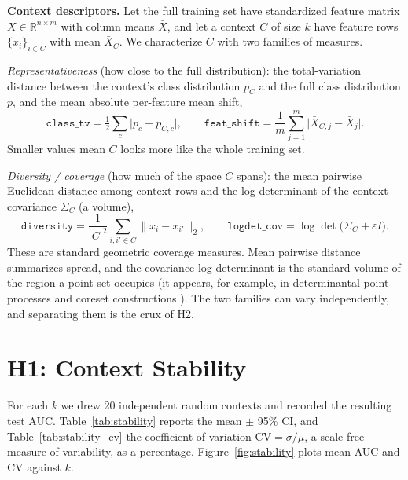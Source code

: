 \documentclass[11pt,a4paper]{article}
\begin{document}
\textbf{Context descriptors.} Let the full training set have standardized
feature matrix $X\in\mathbb{R}^{n\times m}$ with column means $\bar{X}$, and let
a context $C$ of size $k$ have feature rows $\{x_i\}_{i\in C}$ with mean
$\bar{X}_C$. We characterize $C$ with two families of measures.

\emph{Representativeness} (how close to the full distribution): the
total-variation distance between the context's class distribution $p_C$ and the
full class distribution $p$, and the mean absolute per-feature mean shift,
\begin{equation}
\texttt{class\_tv} = \tfrac{1}{2}\sum_{c} \lvert p_c - p_{C,c}\rvert,
\qquad
\texttt{feat\_shift} = \frac{1}{m}\sum_{j=1}^{m}
\bigl\lvert \bar{X}_{C,j} - \bar{X}_{j}\bigr\rvert .
\end{equation}
Smaller values mean $C$ looks more like the whole training set.

\emph{Diversity / coverage} (how much of the space $C$ spans): the mean pairwise
Euclidean distance among context rows and the log-determinant of the context
covariance $\Sigma_C$ (a volume),
\begin{equation}
\texttt{diversity} = \frac{1}{\lvert C\rvert^2}\sum_{i,i'\in C}
\lVert x_i - x_{i'}\rVert_2,
\qquad
\texttt{logdet\_cov} = \log\det\!\bigl(\Sigma_C + \varepsilon I\bigr).
\end{equation}
These are standard geometric coverage measures. Mean pairwise distance
summarizes spread, and the covariance log-determinant is the standard volume of
the region a point set occupies (it appears, for example, in determinantal point
processes \cite{kulesza2012dpp} and coreset constructions
\cite{feldman2020coresets, sener2018coreset}). The two families can vary independently, and
separating them is the crux of H2.

\section{H1: Context Stability}

For each $k$ we drew 20 independent random contexts and recorded the resulting
test AUC. Table~\ref{tab:stability} reports the mean $\pm$ 95\% CI, and
Table~\ref{tab:stability_cv} the coefficient of variation
$\mathrm{CV}=\sigma/\mu$, a scale-free measure of variability, as a percentage.
Figure~\ref{fig:stability} plots mean AUC and CV against $k$.
\end{document}
